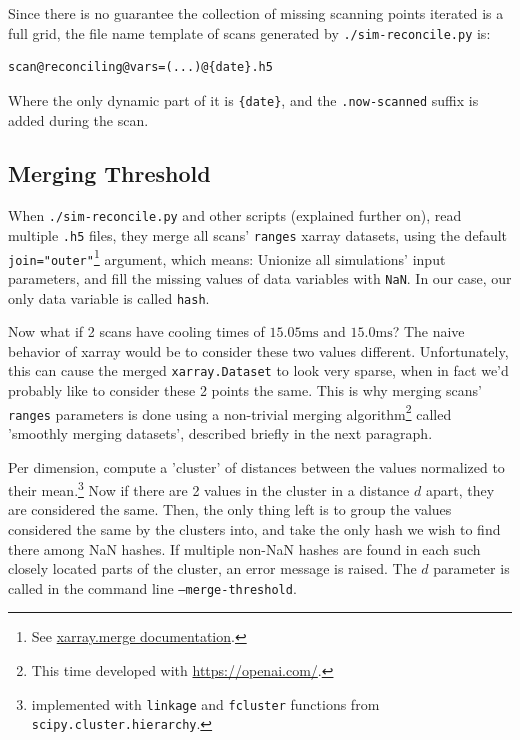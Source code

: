 Since there is no guarantee the collection of missing scanning points iterated is a full grid, the file name template of scans generated by \texttt{./sim-reconcile.py} is:

\begin{verbatim}
scan@reconciling@vars=(...)@{date}.h5
\end{verbatim}

Where the only dynamic part of it is \texttt{\{date\}}, and the \texttt{.now-scanned} suffix is added during the scan.

\subsection{Merging Threshold}\label{ssec:manual/mergine-threshold}

When \texttt{./sim-reconcile.py} and other scripts (explained further on), read multiple \texttt{.h5} files, they merge all scans' \texttt{ranges} xarray datasets, using the default \texttt{join="outer"}\footnote{See \href{https://docs.xarray.dev/en/stable/generated/xarray.merge.html}{xarray.merge documentation}.} argument, which means: Unionize all simulations' input parameters, and fill the missing values of data variables with \texttt{NaN}. In our case, our only data variable is called \texttt{hash}.

Now what if 2 scans have cooling times of $15.05\mathrm{ms}$ and $15.0\mathrm{ms}$? The naive behavior of xarray would be to consider these two values different. Unfortunately, this can cause the merged \texttt{xarray.Dataset} to look very sparse, when in fact we'd probably like to consider these 2 points the same. This is why merging scans' \texttt{ranges} parameters is done using a non-trivial merging algorithm\footnote{This time developed with \url{https://openai.com/}.} called 'smoothly merging datasets', described briefly in the next paragraph.

Per dimension, compute a 'cluster' of distances between the values normalized to their mean.\footnote{implemented with \texttt{linkage} and \texttt{fcluster} functions from \texttt{scipy.cluster.hierarchy}.} Now if there are 2 values in the cluster in a distance $d$ apart, they are considered the same. Then, the only thing left is to group the values considered the same by the clusters into, and take the only hash we wish to find there among NaN hashes. If multiple non-NaN hashes are found in each such closely located parts of the cluster, an error message is raised. The $d$ parameter is called in the command line \texttt{--merge-threshold}.

